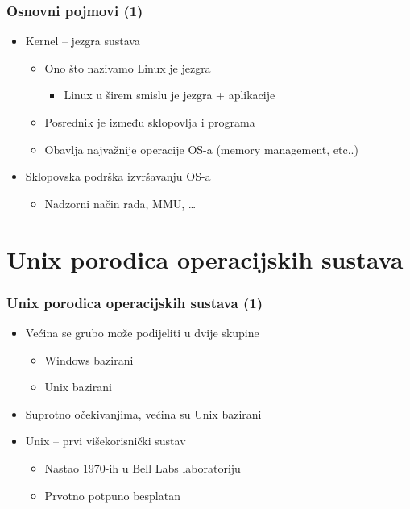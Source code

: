 \documentclass{beamer}
\begin{document}
\begin{frame}[t]
\frametitle{Osnovni pojmovi (1)}
\begin{itemize}
  \item Kernel -- jezgra sustava
  \begin{itemize}
    \item Ono što nazivamo Linux je jezgra
    \begin{itemize}
      \item Linux u širem smislu je jezgra + aplikacije
    \end{itemize}
    \item Posrednik je između sklopovlja i programa
    \item Obavlja najvažnije operacije OS-a (memory management, etc..)
  \end{itemize}
  \item Sklopovska podrška izvršavanju OS-a
  \begin{itemize}
    \item Nadzorni način rada, MMU, \ldots
  \end{itemize}
\end{itemize}
\end{frame}

\section{Unix porodica operacijskih sustava}
\begin{frame}[t]
\frametitle{Unix porodica operacijskih sustava (1)}
\begin{itemize}
  \item Većina se grubo može podijeliti u dvije skupine
  \begin{itemize}
    \item Windows bazirani
    \item Unix bazirani
  \end{itemize}
  \item Suprotno očekivanjima, većina su Unix bazirani
  \item Unix – prvi višekorisnički sustav
  \begin{itemize}
    \item Nastao 1970-ih u Bell Labs laboratoriju
    \item Prvotno potpuno besplatan
  \end{itemize}
\end{itemize}
\end{frame}
\end{document}

